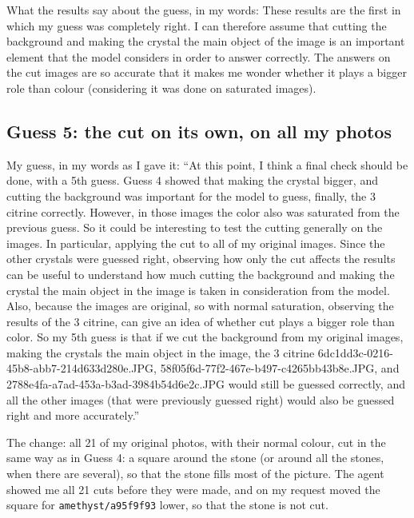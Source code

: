 \documentclass[11pt]{article}
\begin{document}
What the results say about the guess, in my words: These results are the first
in which my guess was completely right. I can therefore assume that cutting the
background and making the crystal the main object of the image is an important
element that the model considers in order to answer correctly. The answers on
the cut images are so accurate that it makes me wonder whether it plays a bigger
role than colour (considering it was done on saturated images).

\subsection*{Guess 5: the cut on its own, on all my photos}

My guess, in my words as I gave it: ``At this point, I think a final check should
be done, with a 5th guess. Guess 4 showed that making the crystal bigger, and
cutting the background was important for the model to guess, finally, the 3
citrine correctly. However, in those images the color also was saturated from
the previous guess. So it could be interesting to test the cutting generally on
the images. In particular, applying the cut to all of my original images. Since
the other crystals were guessed right, observing how only the cut affects the
results can be useful to understand how much cutting the background and making
the crystal the main object in the image is taken in consideration from the
model. Also, because the images are original, so with normal saturation,
observing the results of the 3 citrine, can give an idea of whether cut plays a
bigger role than color. So my 5th guess is that if we cut the background from my
original images, making the crystals the main object in the image, the 3 citrine
6dc1dd3c-0216-45b8-abb7-214d633d280e.JPG, 58f05f6d-77f2-467e-b497-c4265bb43b8e.JPG,
and 2788e4fa-a7ad-453a-b3ad-3984b54d6e2c.JPG would still be guessed correctly,
and all the other images (that were previously guessed right) would also be
guessed right and more accurately.''

The change: all 21 of my original photos, with their normal colour, cut in the
same way as in Guess 4: a square around the stone (or around all the stones,
when there are several), so that the stone fills most of the picture. The agent showed me all 21 cuts
before they were made, and on my request moved the square for
\texttt{amethyst/a95f9f93} lower, so that the stone is not cut.
\end{document}
